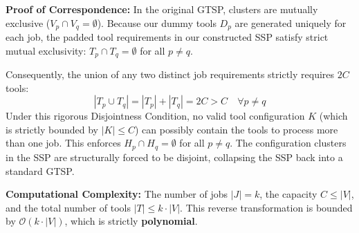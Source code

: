 \documentclass[12pt]{article}
\begin{document}
\textbf{Proof of Correspondence:} In the original GTSP, clusters are mutually exclusive ($V_p \cap V_q = \emptyset$). Because our dummy tools $D_p$ are generated uniquely for each job, the padded tool requirements in our constructed SSP satisfy strict mutual exclusivity: $T_p \cap T_q = \emptyset$ for all $p \neq q$. 

Consequently, the union of any two distinct job requirements strictly requires $2C$ tools:
\begin{equation}
	|T_p \cup T_q| = |T_p| + |T_q| = 2C > C \quad \forall p \neq q
\end{equation}
Under this rigorous Disjointness Condition, no valid tool configuration $K$ (which is strictly bounded by $|K| \le C$) can possibly contain the tools to process more than one job. This enforces $H_p \cap H_q = \emptyset$ for all $p \neq q$. The configuration clusters in the SSP are structurally forced to be disjoint, collapsing the SSP back into a standard GTSP. 

\textbf{Computational Complexity:} The number of jobs $|J| = k$, the capacity $C \le |V|$, and the total number of tools $|T| \le k \cdot |V|$. This reverse transformation is bounded by $\mathcal{O}(k \cdot |V|)$, which is strictly \textbf{polynomial}. 
\end{document}
